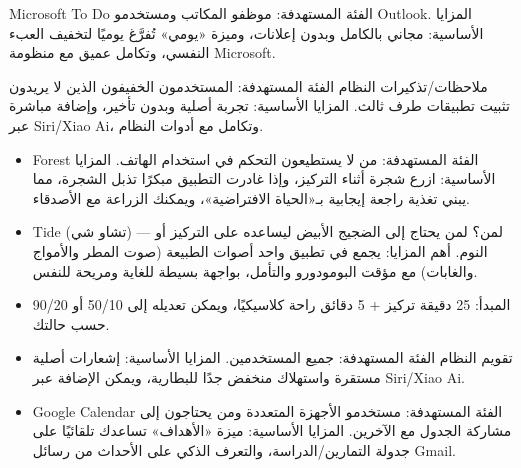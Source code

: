 Microsoft To Do الفئة المستهدفة: موظفو المكاتب ومستخدمو Outlook. المزايا الأساسية: مجاني بالكامل وبدون إعلانات، وميزة «يومي» تُفرَّغ يوميًا لتخفيف العبء النفسي، وتكامل عميق مع منظومة Microsoft.

ملاحظات/تذكيرات النظام الفئة المستهدفة: المستخدمون الخفيفون الذين لا يريدون تثبيت تطبيقات طرف ثالث. المزايا الأساسية: تجربة أصلية وبدون تأخير، وإضافة مباشرة عبر Siri/Xiao Ai، وتكامل مع أدوات النظام.


\begin{itemize}
  \item Forest الفئة المستهدفة: من لا يستطيعون التحكم في استخدام الهاتف. المزايا الأساسية: ازرع شجرة أثناء التركيز، وإذا غادرت التطبيق مبكرًا تذبل الشجرة، مما يبني تغذية راجعة إيجابية بـ«الحياة الافتراضية»، ويمكنك الزراعة مع الأصدقاء.
  \item Tide (تشاو شي) — لمن؟ لمن يحتاج إلى الضجيج الأبيض ليساعده على التركيز أو النوم. أهم المزايا: يجمع في تطبيق واحد أصوات الطبيعة (صوت المطر والأمواج والغابات) مع مؤقت البومودورو والتأمل، بواجهة بسيطة للغاية ومريحة للنفس.
  \item المبدأ: 25 دقيقة تركيز + 5 دقائق راحة كلاسيكيًا، ويمكن تعديله إلى 50/10 أو 90/20 حسب حالتك.
\end{itemize}


\begin{itemize}
  \item تقويم النظام الفئة المستهدفة: جميع المستخدمين. المزايا الأساسية: إشعارات أصلية مستقرة واستهلاك منخفض جدًا للبطارية، ويمكن الإضافة عبر Siri/Xiao Ai.
  \item Google Calendar الفئة المستهدفة: مستخدمو الأجهزة المتعددة ومن يحتاجون إلى مشاركة الجدول مع الآخرين. المزايا الأساسية: ميزة «الأهداف» تساعدك تلقائيًا على جدولة التمارين/الدراسة، والتعرف الذكي على الأحداث من رسائل Gmail.
\end{itemize}


